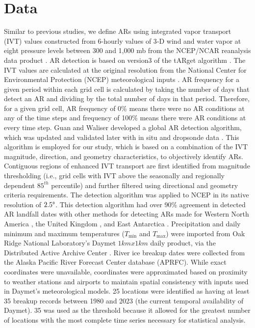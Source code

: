 \documentclass[draft]{AR_analysis_}
\begin{document}
\section{Data}

Similar to previous studies, we define ARs using integrated vapor
transport (IVT) values constructed from 6-hourly values of 3‐D wind and
water vapor at eight pressure levels between 300 and 1,000
mb from the NCEP/NCAR reanalysis data product \cite{NCEP_NCAR_reanalysis}. 
AR detection is based on version3 of the tARget algorithm
\cite{Guan_Waliser2019, bin2022}.
The IVT values are calculated at the original
resolution from the National Center for Environmental Protection (NCEP)
meteorological inputs \cite{NCEP_reanalysis}. AR frequency for a given
period within each grid cell is calculated by taking the number of days
that detect an AR and dividing by the total number of days in that
period. Therefore, for a given grid cell, AR frequency of 0\% means
there were no AR conditions at any of the time steps and frequency of
100\% means there were AR conditions at every time step. Guan and
Waliser \cite{alg_for_detecting_AR_moisture_fluxes} developed a global
AR detection algorithm, which was updated and validated later with in
situ and dropsonde data \cite{bin2022}. This algorithm is employed for
our study, which is based on a combination of the IVT magnitude,
direction, and geometry characteristics, to objectively identify ARs.
Contiguous regions of enhanced IVT transport are first identified from
magnitude thresholding (i.e., grid cells with IVT above the seasonally
and regionally dependent $85^{th}$ percentile) and further filtered
using directional and geometry criteria requirements. The detection
algorithm was applied to NCEP in its native resolution of $2.5 \degree$.
This detection algorithm had over 90\% agreement in detected AR
landfall dates with other methods for detecting ARs made for Western
North America \cite{Neiman2008}, the United Kingdom \cite{Lavers2011}, 
and East Antarctica \cite{Gorodetskaya2014}. Precipitation and daily
minimum and maximum temperatures ($T_{\text{min}}$ and $T_{\text{max}}$) 
were imported from Oak Ridge National
Laboratory's Daymet $1kmx1km$ daily product, via the
Distributed Active Archive Center \cite{daymet}. River ice breakup dates 
were collected from the Alaska Pacific River Forecast Center database 
(APRFC). While exact coordinates were unavailable, coordinates were 
approximated based on proximity to weather stations and airports to 
maintain spatial consistency with inputs used in Daymet’s meteorological 
models. 25 locations were identified as having at least 35 breakup 
records between 1980 and 2023 (the current temporal availability of 
Daymet). 35 was used as the threshold because it allowed for the greatest 
number of locations with the most complete time series 
necessary for statistical analysis.
\end{document}
